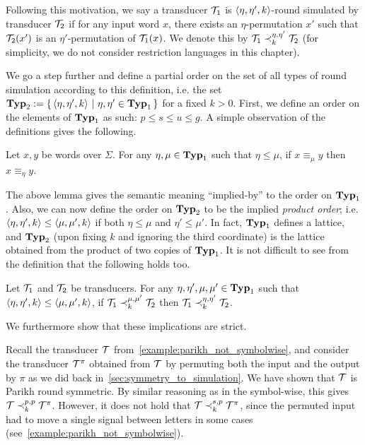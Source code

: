 Following this motivation, we say a transducer $\mathcal{T}_1$ is $\left< \eta, \eta', k\right>$-round simulated by transducer $\mathcal{T}_2$ if for any input word $x$, there exists an $\eta$-permutation $x'$ such that $\mathcal{T}_2(x')$ is an $\eta'$-permutation of $\mathcal{T}_1(x)$. We denote this by $\mathcal{T}_1 \prec_{k}^{\eta,\eta'} \mathcal{T}_2$ (for simplicity, we do not consider restriction languages in this chapter).

We go a step further and define a partial order on the set of all types of round simulation according to this definition, i.e. the set $\mathbf{Typ}_2:=\left\{\,\left< \eta, \eta', k\right>\ \middle|\ \eta,\eta'\in \mathbf{Typ}_1\,\right\}$ for a fixed $k>0$. First, we define an order on the elements of $\mathbf{Typ}_1$ as such: $p\leq s\leq u\leq g$. A simple observation of the definitions gives the following.

\begin{lemma}
    Let $x,y$ be words over $\Sigma$. For any $\eta,\mu\in\mathbf{Typ}_1$ such that $\eta\leq \mu$, if $x\equiv_\mu y$ then $x\equiv_\eta y$.
\end{lemma}

The above lemma gives the semantic meaning ``implied-by'' to the order on $\mathbf{Typ}_1$. Also, we can now define the order on $\mathbf{Typ}_2$ to be the implied \emph{product order}; i.e. $\left< \eta, \eta', k\right>\leq \left< \mu, \mu', k\right>$ if both $\eta\leq \mu$ and $\eta'\leq \mu'$. In fact, $\mathbf{Typ}_1$ defines a lattice, and $\mathbf{Typ}_2$ (upon fixing $k$ and ignoring the third coordinate) is the lattice obtained from the product of two copies of $\mathbf{Typ}_1$. It is not difficult to see from the definition that the following holds too.

\begin{lemma}
\label{lemma:partial_order_tups}
        Let $\mathcal{T}_1$ and $\mathcal{T}_2$ be transducers. For any $\eta,\eta',\mu,\mu'\in\mathbf{Typ}_1$ such that $\left< \eta,\eta',k\right>\leq \left< \mu,\mu',k\right>$, if $\mathcal{T}_1 \prec_{k}^{\mu,\mu'} \mathcal{T}_2$ then $\mathcal{T}_1 \prec_{k}^{\eta,\eta'} \mathcal{T}_2$.
\end{lemma}
We furthermore show that these implications are strict.

Recall the transducer $\mathcal{T}$ from~\cref{example:parikh_not_symbolwise}, and consider the transducer $\mathcal{T}^\pi$ obtained from $\mathcal{T}$ by permuting both the input and the output by $\pi$ as we did back in~\cref{sec:symmetry_to_simulation}. We have shown that $\mathcal{T}$ is Parikh round symmetric. By similar reasoning as in the symbol-wise, this gives $\mathcal{T}\prec^{p,p}_k \mathcal{T}^\pi$. However, it does not hold that $\mathcal{T}\prec^{s,p}_k \mathcal{T}^\pi$, since the permuted input had to move a single signal between letters in some cases (see~\cref{example:parikh_not_symbolwise}).

